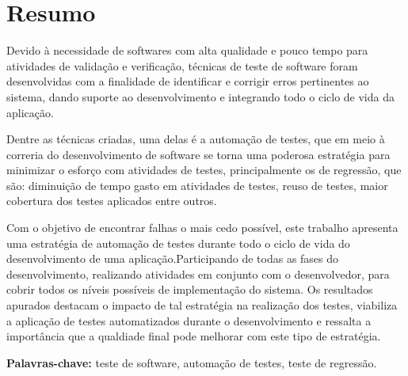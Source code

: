 \chapter*{Resumo}

Devido à necessidade de softwares com alta qualidade e pouco tempo para atividades de validação e verificação, técnicas de teste de software foram desenvolvidas com a finalidade de identificar e corrigir erros pertinentes ao sistema, dando suporte ao desenvolvimento e integrando todo o ciclo de vida da aplicação. 

Dentre as técnicas criadas, uma delas é a automação de testes, que em meio à correria do desenvolvimento de software se torna uma poderosa estratégia para minimizar o esforço com atividades de testes, principalmente os de regressão, que são: diminuição de tempo gasto em atividades de testes, reuso de testes, maior cobertura dos testes aplicados entre outros. 

Com o objetivo de encontrar falhas o mais cedo possível, este trabalho apresenta uma estratégia de automação de testes durante todo o ciclo de vida do desenvolvimento de uma aplicação.Participando de todas as fases do desenvolvimento, realizando atividades em conjunto com o desenvolvedor, para cobrir todos os níveis possíveis de implementação do sistema. Os resultados apurados destacam o impacto de tal estratégia na realização dos testes, viabiliza a aplicação de testes automatizados durante o desenvolvimento e ressalta a importância que a qualdiade final pode melhorar com este tipo de estratégia. 



\textbf{Palavras-chave:} teste de software, automação de testes, teste de regressão.
